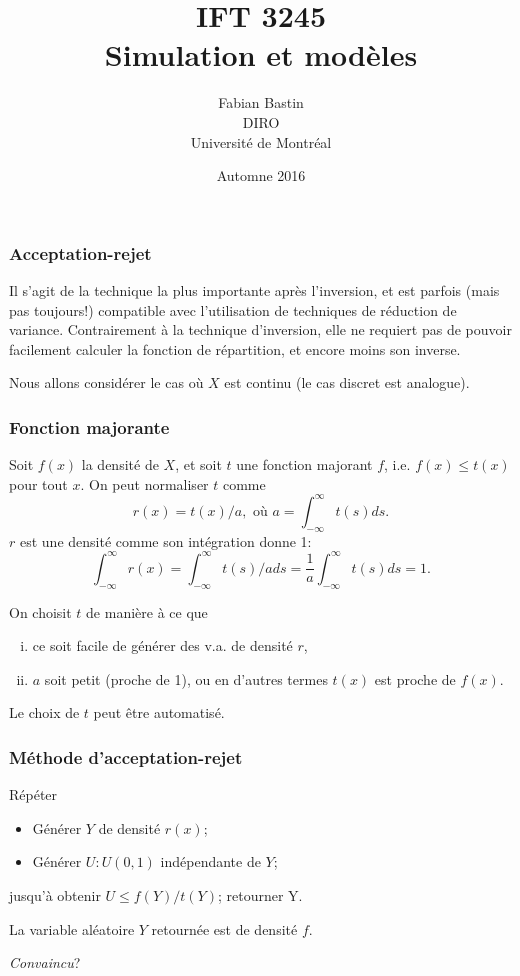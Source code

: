 \documentclass[t,usepdftitle=false]{beamer}
\title[IFT3245]{IFT 3245\\Simulation et modèles}
\author[Fabian Bastin]{Fabian Bastin\\DIRO\\Université de Montréal}
\date{Automne 2016}
\begin{document}
\frame{\titlepage}

\begin{frame}
\frametitle{Acceptation-rejet}

Il s'agit de la technique la plus importante après l'inversion, et est
parfois (mais pas toujours!) compatible avec l'utilisation de
techniques de réduction de variance.
Contrairement à la technique d'inversion, elle ne requiert pas de
pouvoir facilement calculer la fonction de répartition, et encore
moins son inverse.

\mbox{}

Nous allons considérer le cas où $X$ est continu (le cas discret est analogue).

\end{frame}

\begin{frame}
\frametitle{Fonction majorante}

Soit $f(x)$ la densité de $X$, et soit $t$ une fonction majorant $f$, i.e. $f (x) \leq t(x)$ pour tout $x$.
On peut normaliser $t$ comme
\[
r(x) = t(x)/a,\mbox{ où }a = \int_{-\infty}^{\infty} t(s)ds.
\]
$r$ est une densité comme son intégration donne 1:
\[
\int_{-\infty}^{\infty} r(x) = \int_{-\infty}^{\infty} t(s)/a ds
= \frac{1}{a} \int_{-\infty}^{\infty} t(s) ds = 1.
\]


\mbox{}

On choisit $t$ de manière à ce que
\begin{enumerate}[(i)]
\item
ce soit facile de générer des v.a. de densité $r$,
\item$a$ soit petit (proche de 1), ou en d'autres termes $t(x)$ est
  proche de $f(x)$.
\end{enumerate}
Le choix de $t$ peut être automatisé.

\end{frame}

\begin{frame}
\frametitle{Méthode d'acceptation-rejet}

Répéter
\begin{itemize}
\item
Générer $Y$ de densité $r(x)$;\\
\item
Générer $U : U (0, 1)$ indépendante de $Y$;\\
\end{itemize}
jusqu'à obtenir $U \leq f (Y )/t(Y )$; retourner Y.

\mbox{}

La variable aléatoire $Y$ retournée est de densité $f$.

\mbox{}

\textit{Convaincu}?
\end{frame}
\end{document}
